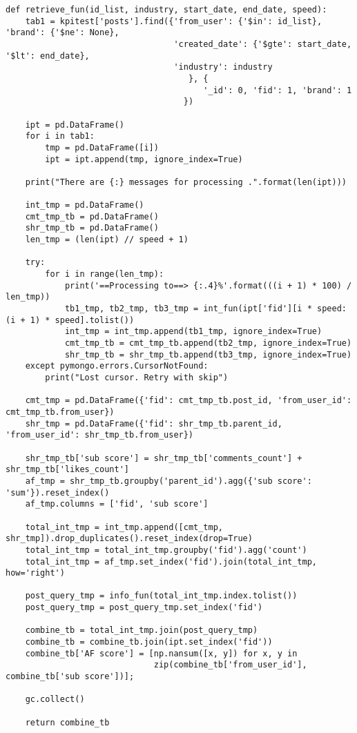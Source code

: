 \documentclass[12pt]{article}
\numberwithin{equation}{section}
\begin{document}
\begin{lstlisting}
def retrieve_fun(id_list, industry, start_date, end_date, speed):
    tab1 = kpitest['posts'].find({'from_user': {'$in': id_list}, 'brand': {'$ne': None},
                                  'created_date': {'$gte': start_date, '$lt': end_date},
                                  'industry': industry
                                     }, {
                                        '_id': 0, 'fid': 1, 'brand': 1
                                    })

    ipt = pd.DataFrame()
    for i in tab1:
        tmp = pd.DataFrame([i])
        ipt = ipt.append(tmp, ignore_index=True)

    print("There are {:} messages for processing .".format(len(ipt)))

    int_tmp = pd.DataFrame()
    cmt_tmp_tb = pd.DataFrame()
    shr_tmp_tb = pd.DataFrame()
    len_tmp = (len(ipt) // speed + 1)

    try:
        for i in range(len_tmp):
            print('==Processing to==> {:.4}%'.format(((i + 1) * 100) / len_tmp))
            tb1_tmp, tb2_tmp, tb3_tmp = int_fun(ipt['fid'][i * speed:(i + 1) * speed].tolist())
            int_tmp = int_tmp.append(tb1_tmp, ignore_index=True)
            cmt_tmp_tb = cmt_tmp_tb.append(tb2_tmp, ignore_index=True)
            shr_tmp_tb = shr_tmp_tb.append(tb3_tmp, ignore_index=True)
    except pymongo.errors.CursorNotFound:
        print("Lost cursor. Retry with skip")

    cmt_tmp = pd.DataFrame({'fid': cmt_tmp_tb.post_id, 'from_user_id': cmt_tmp_tb.from_user})
    shr_tmp = pd.DataFrame({'fid': shr_tmp_tb.parent_id, 'from_user_id': shr_tmp_tb.from_user})

    shr_tmp_tb['sub score'] = shr_tmp_tb['comments_count'] + shr_tmp_tb['likes_count']
    af_tmp = shr_tmp_tb.groupby('parent_id').agg({'sub score': 'sum'}).reset_index()
    af_tmp.columns = ['fid', 'sub score']

    total_int_tmp = int_tmp.append([cmt_tmp, shr_tmp]).drop_duplicates().reset_index(drop=True)
    total_int_tmp = total_int_tmp.groupby('fid').agg('count')
    total_int_tmp = af_tmp.set_index('fid').join(total_int_tmp, how='right')

    post_query_tmp = info_fun(total_int_tmp.index.tolist())
    post_query_tmp = post_query_tmp.set_index('fid')

    combine_tb = total_int_tmp.join(post_query_tmp)
    combine_tb = combine_tb.join(ipt.set_index('fid'))
    combine_tb['AF score'] = [np.nansum([x, y]) for x, y in
                              zip(combine_tb['from_user_id'], combine_tb['sub score'])];

    gc.collect()

    return combine_tb
\end{lstlisting}
\end{document}
